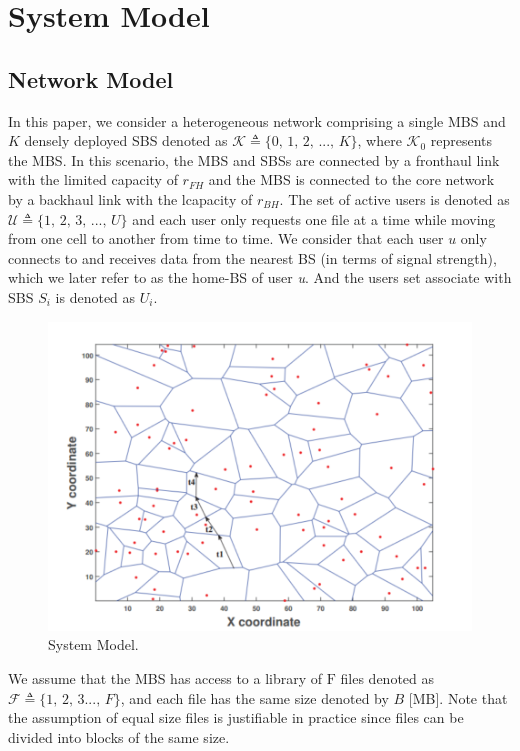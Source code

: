 \documentclass[conference]{IEEEtran}
\begin{document}
\section{System Model}
\subsection{Network Model}
In this paper, we consider a heterogeneous network comprising a single MBS and $K$ densely deployed SBS denoted as $\mathcal{K} \triangleq\{0\mathrm{,\,}1\mathrm{,\,}2\mathrm{,\,}...\mathrm{,\,}K\}$, where $\mathcal{K}_0$ represents the MBS. In this scenario, the MBS and SBSs are connected by a fronthaul link with the limited capacity of $r_{FH}$ and the MBS is connected to the core network by a backhaul link with the lcapacity of $ r_{BH}$. The set of active users is denoted as $\mathcal{U} \triangleq\{1\mathrm{,\,}2\mathrm{,\,}3\mathrm{,\,}...\mathrm{,\,}U\}$ and each user only requests one file at a time while moving from one cell to another from time to time. We consider that each user $u$ only connects to and receives data from the nearest BS (in terms of signal strength), which we later refer to as the  home-BS of user \emph{u}. And the users set associate with SBS $S_i$ is denoted as $U_i$.

\begin{figure}[htbp]
 \centerline{\includegraphics[scale=1]{fig1.png}}
 \caption{System Model.}
 \label{fig 1}
\end{figure}

We assume that the MBS has access to a library of $\mathrm{F}$ files denoted as $\mathcal{F} \triangleq\{1\mathrm{,\,}2\mathrm{,\,}3...\mathrm{,\,}F\}$, and each file has the same size denoted by $B$ [MB]. Note that the assumption of equal size files is justifiable in practice since files can be divided into blocks of the same size.
\end{document}
